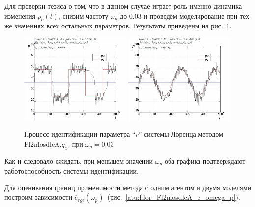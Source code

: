 Для проверки тезиса о том, что в данном случае играет роль
именно динамика изменения $p_o(t)$, снизим частоту $\omega_p$ до $0.03$
и проведём моделирование при тех же значениях
всех остальных параметров. Результаты приведены на рис.~\ref{atu:f:lor_id_Fl2nlosdlcA_003}.

\begin{figure}[ht!]
  \centerline{
    \includegraphics[width=0.49\textwidth]{p/cha/lor/Fl2nlosdlcA/Fl2nlosdlcA-p_xz_1_wp003.png}
    \hfill
    \includegraphics[width=0.49\textwidth]{p/cha/lor/Fl2nlosdlcA/Fl2nlosdlcA-p_xz_0_wp003.png}
  }
  \caption{Процесс идентификации параметра ``$r$'' системы Лоренца методом Fl2nlosdlcA.$q_{x^2}$ при $\omega_p=0.03$}
  \label{atu:f:lor_id_Fl2nlosdlcA_003}
\end{figure}

Как и следовало ожидать, при меньшем значении $\omega_p$
оба графика подтверждают работоспособность системы идентификации.

Для оценивания границ применимости метода с одним агентом
и двумя моделями построим зависимости
$\overline{e}_{rge}(\omega_p)$~(рис.~\ref{atu:f:lor_Fl2nlosdlcA_e_omega_p}).

